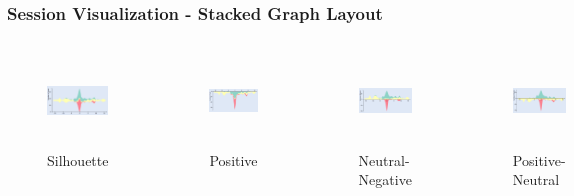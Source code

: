 \documentclass{beamer}
\begin{document}
\begin{frame}
\frametitle{Session Visualization - Stacked Graph Layout}
\begin{columns}
\centering
\begin{figure}
\includegraphics[width=5cm,height=2.4cm]{images/stackedgraph_silhouette.png}
\caption{Silhouette}
\end{figure}
\begin{figure}
\includegraphics[width=5cm,height=2.4cm]{images/stackedgraph_positive.png}
\caption{Positive}
\end{figure}

\centering
\begin{figure}
\includegraphics[width=5cm,height=2.4cm]{images/stackedgraph_neutral_neg.png}
\caption{Neutral-Negative}
\end{figure}
\begin{figure}
\includegraphics[width=5cm,height=2.4cm]{images/stackedgraph_positive_neutral.png}
\caption{Positive-Neutral}
\end{figure}

\end{columns}
\end{frame}
\end{document}
